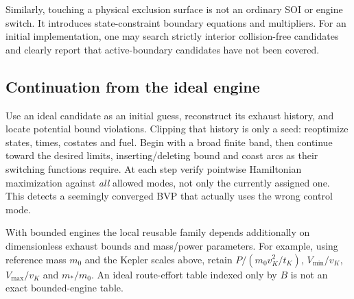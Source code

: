 \documentclass[journal, a4paper]{IEEEtran}
\begin{document}
Similarly, touching a physical exclusion surface is not an ordinary SOI or engine switch. It introduces state-constraint boundary equations and multipliers. For an initial implementation, one may search strictly interior collision-free candidates and clearly report that active-boundary candidates have not been covered.

\subsection{Continuation from the ideal engine}
Use an ideal candidate as an initial guess, reconstruct its exhaust history, and locate potential bound violations. Clipping that history is only a seed: reoptimize states, times, costates and fuel. Begin with a broad finite band, then continue toward the desired limits, inserting/deleting bound and coast arcs as their switching functions require. At each step verify pointwise Hamiltonian maximization against \emph{all} allowed modes, not only the currently assigned one. This detects a seemingly converged BVP that actually uses the wrong control mode.

With bounded engines the local reusable family depends additionally on dimensionless exhaust bounds and mass/power parameters. For example, using reference mass $m_0$ and the Kepler scales above, retain $P/(m_0v_K^2/t_K)$, $V_{\min}/v_K$, $V_{\max}/v_K$ and $m_*/m_0$. An ideal route-effort table indexed only by $B$ is not an exact bounded-engine table.
\end{document}
